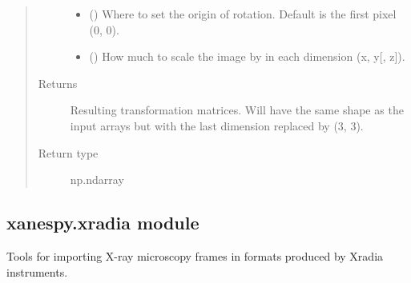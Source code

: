 \documentclass[letterpaper,10pt,english]{sphinxmanual}
\begin{document}
\begin{fulllineitems}
\begin{quote}
\begin{description}
\begin{itemize}
\item {} 
 (\sphinxstyleliteralemphasis{, }) \textendash{} Where to set the origin of rotation. Default is the
first pixel (0, 0).

\item {} 
 (\sphinxstyleliteralemphasis{, }) \textendash{} How much to scale the image by in each dimension
(x, y{[}, z{]}).

\end{itemize}

\item[{Returns}] \leavevmode
{} \textendash{} Resulting transformation matrices. Will have the same shape as the
input arrays but with the last dimension replaced by (3, 3).

\item[{Return type}] \leavevmode
np.ndarray

\end{description}\end{quote}

\end{fulllineitems}



\subsection{xanespy.xradia module}
\label{\detokenize{xanespy:xanespy-xradia-module}}\label{\detokenize{xanespy:module-xanespy.xradia}}
Tools for importing X-ray microscopy frames in formats produced by
Xradia instruments.
\end{document}
